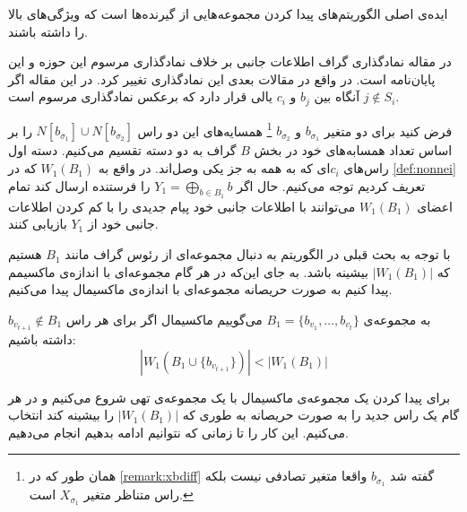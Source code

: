 ایده‌ی اصلی الگوریتم‌های
 پیدا کردن مجموعه‌هایی از گیرنده‌ها است که ویژگی‌های بالا را داشته باشند.
 
 \begin{remark}
 	در مقاله
 	\cite{pliablefirstpaper}
 	نمادگذاری گراف اطلاعات جانبی بر خلاف نمادگذاری مرسوم این حوزه و این پایان‌نامه است. در واقع در مقالات بعدی این نمادگذاری تغییر کرد. در این مقاله اگر
 	$j \notin S_i$
 	آنگاه بین
 	$b_j$
 	و
 	$c_i$
 	یالی قرار دارد که برعکس نمادگذاری مرسوم است.
 \end{remark}
 
 فرض کنید برای دو متغیر
 $b_{\sigma_1}$
 و
 $b_{\sigma_2}$
 \footnote{
 همان طور که در
 \autoref{remark:xbdiff}
 گفته شد 
 $b_{\sigma_1}$
 واقعا متغیر تصادفی نیست بلکه راس متناظر متغیر
 $X_{\sigma_1}$
 است.
 }
 همسایه‌های این دو راس
 $N[b_{\sigma_1}] \cup N[b_{\sigma_2}]$
 را بر اساس تعداد همسابه‌های خود در بخش
 $B$
 گراف به دو دسته تقسیم می‌کنیم. دسته اول راس‌های
 $c_i$ای
 که به همه به جز یکی وصل‌اند. در واقع به
 $W_1(B_1)$
 که در
 \autoref{def:nonnei}
 تعریف کردیم توجه می‌کنیم. حال اگر
  $Y_1 = \bigoplus\limits_{b \in B_1} b$
  را فرستنده ارسال کند تمام اعضای
  $W_1(B_1)$
  می‌توانند با اطلاعات جانبی خود پیام جدیدی را با کم کردن اطلاعات جانبی خود از
  $Y_1$
  بازیابی کنند.
  
 با توجه به بحث قبلی در الگوریتم
\GRCOVone
به دنبال مجموعه‌ای از رئوس گراف مانند
$B_1$
هستیم که 
$|W_1(B_1)|$
بیشینه باشد. به جای این‌که در هر گام مجموعه‌ای با اندازه‌ی ماکسیمم پیدا کنیم به صورت حریصانه مجموعه‌ای با اندازه‌ی ماکسیمال پیدا می‌کنیم.

به مجموعه‌ی 
$B_1 = \{b_{v_1}, \ldots, b_{v_t}\}$
می‌گوییم ماکسیمال اگر برای هر راس
$b_{v_{t  +1}} \notin B_1$
داشته باشیم:
\begin{equation}
	\tag{شرط ماکسیمال بودن}
	|W_1(B_1 \cup \{b_{v_{t + 1}} \})| < |W_1(B_1)|
\end{equation}

برای پیدا کردن یک مجموعه‌ی ماکسیمال با یک مجموعه‌ی تهی شروع می‌کنیم و در هر گام یک راس جدید را به صورت حریصانه به طوری که 
$|W_1(B_1)|$
را بیشینه کند انتخاب می‌کنیم. این کار را تا زمانی که نتوانیم ادامه بدهیم انجام می‌دهیم.

